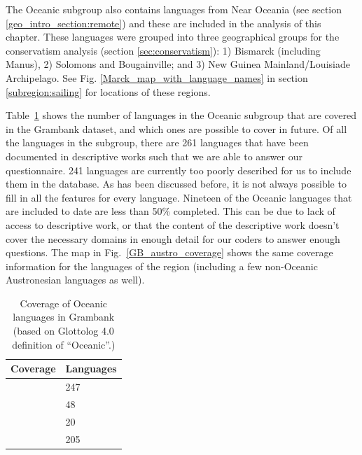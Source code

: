 \documentclass[draft,10pt]{article} %
\begin{document}

The Oceanic subgroup also contains languages from Near Oceania (see section \ref{geo_intro_section:remote}) and these are included in the analysis of this chapter. These languages were grouped into three geographical groups for the conservatism analysis (section \ref{sec:conservatism}): 1) Bismarck (including Manus), 2) Solomons and Bougainville; and 3) New Guinea Mainland/Louisiade Archipelago. See Fig. \ref{Marck_map_with_language_names} in section \ref{subregion:sailing} for locations of these regions.

Table~\ref{GB_coverage_table} shows the number of languages in the Oceanic subgroup that are covered in the Grambank dataset, and which ones are possible to cover in future. Of all the languages in the subgroup, there are 261 languages that have been documented in descriptive works such that we are able to answer our questionnaire. 241 languages are currently too poorly described for us to include them in the database. As has been discussed before, it is not always possible to fill in all the features for every language. Nineteen of the Oceanic languages that are included to date are less than 50\% completed. This can be due to lack of access to descriptive work, or that the content of the descriptive work doesn't cover the necessary domains in enough detail for our coders to answer enough questions. The map in Fig.~\ref{GB_austro_coverage} shows the same coverage information for the languages of the region (including a few non-Oceanic Austronesian languages as well). 


\begin{centering}
\begin{table}[h]
\caption{{Coverage of Oceanic languages in Grambank (based on Glottolog 4.0 definition of ``Oceanic''.)}}
\label{GB_coverage_table}
\centering
\begin{tabular}{|l|l|}
\hline
\textbf{Coverage} & \textbf{Languages} \\
\hline
\textbf{\cellcolor{hedvig_orange!50}{No grammar}} &  247  \\
\hline
\textbf{\cellcolor{hedvig_blue!50}{Grammar exists, but language not in Grambank (yet)}} & 48 \\
\hline
\textbf{\cellcolor{hedvig_lightgreen!50}{Less than half of the features covered in Grambank}} &  20  \\
\hline
\textbf{\cellcolor{hedvig_darkgreen!50}{More than half of the features covered in Grambank}} &  205  \\
\hline
\end{tabular}
\end{table}
\end{centering}
\end{document}
